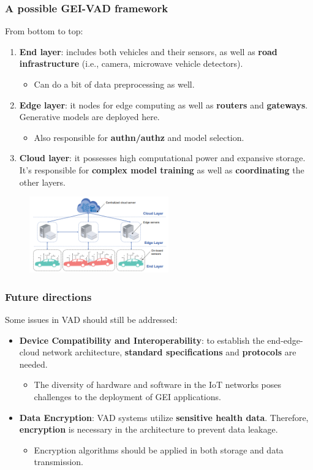 \documentclass{beamer}
\begin{document}
\begin{frame}
  \frametitle{A possible GEI-VAD framework}
  From bottom to top:
  \begin{enumerate}
    \item \textbf{End layer}: includes both vehicles and their sensors,
    as well as \textbf{road infrastructure} (i.e., camera, microwave vehicle detectors).
    \begin{itemize}
      \item Can do a bit of data preprocessing as well.
    \end{itemize}
    \item \textbf{Edge layer}: it nodes for edge computing as well as \textbf{routers} and \textbf{gateways}.
    Generative models are deployed here.
    \begin{itemize}
      \item Also responsible for \textbf{authn/authz} and model selection.
    \end{itemize}
    \item \textbf{Cloud layer}: it possesses high computational power and expansive storage. It's responsible 
    for \textbf{complex model training} as well as \textbf{coordinating} the other layers.
  \end{enumerate}
  \begin{figure}[t]
    \includegraphics[width=6cm]{images/gei-vad.png}
    \centering
    \end{figure}
\end{frame}

\begin{frame}
  \frametitle{Future directions}
  Some issues in VAD should still be addressed:
  \begin{itemize}
    \item \textbf{Device Compatibility and Interoperability}: to establish
    the end-edge-cloud network architecture, \textbf{standard specifications} 
    and \textbf{protocols} are needed.
    \begin{itemize}
      \item The diversity of
      hardware and software in the IoT networks poses challenges to the 
      deployment of GEI applications.
    \end{itemize}
    \item \textbf{Data Encryption}: VAD systems utilize
    \textbf{sensitive health data}. Therefore,
    \textbf{encryption} is necessary in the architecture to prevent data
    leakage.
    \begin{itemize}
      \item Encryption algorithms should be applied in both storage and data transmission.
    \end{itemize}
  \end{itemize}
\end{frame}
\end{document}
